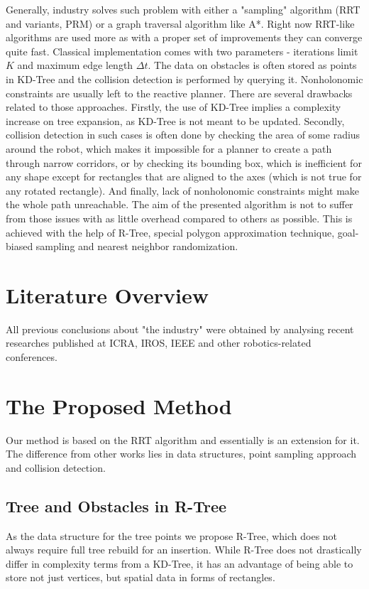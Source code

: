 \documentclass[a4paper,12pt]{article}
\DeclareRobustCommand{\[}{\begin{equation}}
\DeclareRobustCommand{\]}{\end{equation}}
\numberwithin{equation}{section}
\numberwithin{algorithm}{section}
\begin{document}
Generally, industry solves such problem with either a "sampling" algorithm (RRT and variants, PRM) or a graph traversal algorithm like A*. Right now RRT-like algorithms are used more as with a proper set of improvements they can converge quite fast. Classical implementation comes with two parameters - iterations limit $K$ and maximum edge length $\Delta{t}$. The data on obstacles is often stored as points in KD-Tree and the collision detection is performed by querying it. Nonholonomic constraints are usually left to the reactive planner. There are several
drawbacks related to those approaches. Firstly, the use of KD-Tree implies a complexity increase on tree expansion, as KD-Tree is not meant to be updated. Secondly, collision detection in such cases is often done by checking the area of some radius around the robot, which makes it impossible for a planner to create a path through narrow corridors, or by checking its bounding box, which is inefficient for any shape except for rectangles that are aligned to the axes (which is not true for any rotated rectangle). And finally, lack of nonholonomic constraints might make the whole path unreachable. The aim of the presented algorithm is not to suffer from those issues with as little overhead compared to others as possible.
This is achieved with the help of R-Tree, special polygon approximation technique, goal-biased sampling and nearest neighbor randomization.

\section{Literature Overview}

All previous conclusions about "the industry" were obtained by analysing recent researches published at ICRA, IROS, IEEE and other robotics-related conferences.

\section{The Proposed Method}
Our method is based on the RRT algorithm and essentially is an extension for it. The difference from other works lies in data structures,
point sampling approach and collision detection.

\subsection{Tree and Obstacles in R-Tree}

As the data structure for the tree points we propose R-Tree, which does not always require full tree rebuild for an insertion.
While R-Tree does not drastically differ in complexity terms from a KD-Tree, it has an advantage of being able to store not just vertices,
but spatial data in forms of rectangles.
\end{document}
